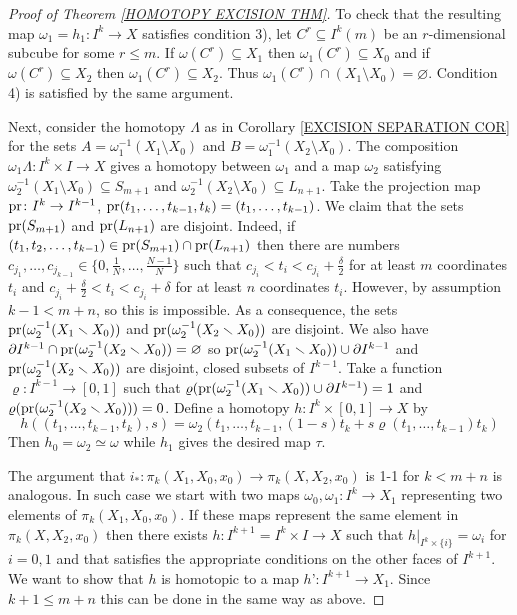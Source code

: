 \begin{proof}[Proof of Theorem \ref{HOMOTOPY  EXCISION THM}]
To check that the resulting map $\omega_{1} = h_{1}\colon I^{k}\to X$ satisfies 
condition 3), let $C^{r}\subseteq I^{k}(m)$ be an $r$-dimensional subcube for some 
$r \leq m$. If $\omega(C^{r})\subseteq X_{1}$ then $\omega_{1}(C^{r})\subseteq X_{0}$ and 
if $\omega(C^{r})\subseteq X_{2}$ then $\omega_{1}(C^{r})\subseteq X_{2}$. 
Thus $\omega_{1}(C^{r})\cap (X_{1}\setminus X_{0}) = \varnothing$. Condition 4)
is satisfied by the same argument.  


Next, consider the homotopy $\Lambda$ as in Corollary \ref{EXCISION SEPARATION COR}
for the sets  $A = \omega_{1}^{-1}(X_{1} \setminus X_{0})$ and 
$B = \omega_{1}^{-1}(X_{2} \setminus X_{0})$. The composition 
$\omega_{1}\Lambda\colon I^{k}\times I \to X$ gives a homotopy between $\omega_{1}$
and a map $\omega_{2}$ satisfying 
$\omega_{2}^{-1}(X_{1}\setminus X_{0}) \subseteq S_{m+1}$ and 
$\omega_{2}^{-1}(X_{2}\setminus X_{0}) \subseteq L_{n+1}$. 
Take the projection map $\operatorname{pr}\colon I^{k} \to I^{k-1}$, 
$\operatorname{pr}(t_{1}, \dots, t_{k-1}, t_{k}) = (t_{1}, \dots, t_{k-1})$. We claim 
that the sets $\operatorname{pr}(S_{m+1})$ and $\operatorname{pr}(L_{n+1})$ are disjoint. Indeed, 
if $(t_{1}, t_{2}, \dots, t_{k-1})\in \operatorname{pr}(S_{m+1})\cap \operatorname{pr}(L_{n+1})$ then 
there are numbers $c_{j_{1}}, \dots, c_{j_{k-1}}\in \{0, \frac{1}{N}, \dots, \frac{N-1}{N} \}$
such that $c_{j_{i}} < t_{i} < c_{j_{i}} + \frac{\delta}{2}$ 
for at least $m$ coordinates $t_{i}$
and $c_{j_{i}} + \frac{\delta}{2} < t_{i} < c_{j_{i}} + \delta$ for at least $n$ 
coordinates $t_{i}$. However, by assumption $k-1 < m+n$, so this is impossible.
As a consequence, the sets $\operatorname{pr}(\omega_{2}^{-1}(X_{1}\smallsetminus X_{0}))$
and $\operatorname{pr}(\omega_{2}^{-1}(X_{2}\smallsetminus X_{0}))$ are disjoint. We also 
have $\partial I^{k-1}\cap \operatorname{pr}(\omega_{2}^{-1}(X_{2}\smallsetminus X_{0})) = \varnothing$ 
so 
$\operatorname{pr}(\omega_{2}^{-1}(X_{1}\smallsetminus X_{0}))  \cup \partial I^{k-1}$ 
and $ \operatorname{pr}(\omega_{2}^{-1}(X_{2}\smallsetminus X_{0}))$ 
are disjoint, closed subsets of $I^{k-1}$. Take a function 
$\varrho\colon I^{k-1}\to [0, 1]$ such that 
$\varrho(\operatorname{pr}(\omega_{2}^{-1}(X_{1}\smallsetminus X_{0})) \cup \partial I^{k-1}) = 1$ and 
$\varrho(\operatorname{pr}(\omega_{2}^{-1}(X_{2}\smallsetminus X_{0}))) = 0$. 
Define a homotopy $h\colon I^{k}\times [0, 1]\to X$ by
\[
h((t_{1}, \dots, t_{k-1}, t_{k}), s) = 
\omega_{2}(t_{1}, \dots, t_{k-1}, (1-s)t_{k} + s\varrho(t_{1}, \dots, t_{k-1})t_{k})
\]
Then $h_{0} = \omega_{2} \simeq \omega$ while $h_{1}$ gives the desired map $\tau$.

The argument that 
$i_{\ast}\colon \pi_{k}(X_{1}, X_{0}, x_{0}) \to \pi_{k}(X, X_{2}, x_{0})$
is 1-1 for $k < m+n$ is analogous. In such case we start with two maps
$\omega_{0}, \omega_{1} \colon I^{k} \to X_{1}$ representing two elements of 
$\pi_{k}(X_{1}, X_{0}, x_{0})$. If these maps represent the same element in 
$\pi_{k}(X, X_{2}, x_{0})$ then there exists 
$h\colon I^{k+1} = I^{k}\times I \to X$ such that 
$h|_{I^{k}\times \{i\}} = \omega_{i}$ for $i=0, 1$ 
and that satisfies the appropriate conditions on the other faces of $I^{k+1}$. 
We want to show that $h$ is homotopic to a map $h’\colon I^{k+1} \to X_{1}$. 
Since $k+1 \leq m+n$ this can be done in the same way as above.
\end{proof}




